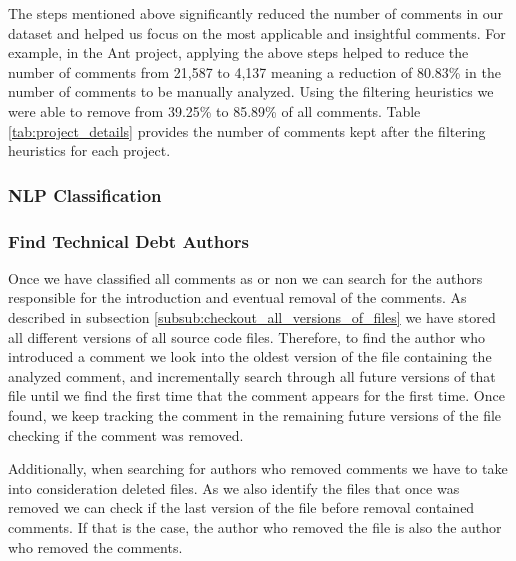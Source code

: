 The steps mentioned above significantly reduced the number of comments in our dataset and helped us focus on the most applicable and insightful comments. For example, in the Ant project, applying the above steps helped to reduce the number of comments from 21,587 to 4,137 meaning a reduction of 80.83\% in the number of comments to be manually analyzed. Using the filtering heuristics we were able to remove from 39.25\% to 85.89\% of all comments. Table \ref{tab:project_details} provides the number of comments kept after the filtering heuristics for each project.

\subsubsection*{NLP Classification}
\label{subsub:nlp_classification}

\subsubsection*{Find Technical Debt Authors}
\label{subsub:find_technical_debt_authors}

Once we have classified all comments as \SATD or non \SATD we can search for the authors responsible for the introduction and eventual removal of the \SATD comments. As described in subsection \ref{subsub:checkout_all_versions_of_files} we have stored all different versions of all source code files. Therefore, to find the author who introduced a \SATD comment we look into the oldest version of the file containing the analyzed comment, and incrementally search through all future versions of that file until we find the first time that the comment appears for the first time. Once found, we keep tracking the \SATD comment in the remaining future versions of the file checking if  the \SATD comment was removed. 

Additionally, when searching for authors who removed \SATD comments we have to take into consideration deleted files. As we also identify the files that once was removed we can check if the last version of the file before removal contained \SATD comments. If that is the case, the author who removed the file is also the author who removed the \SATD comments. 